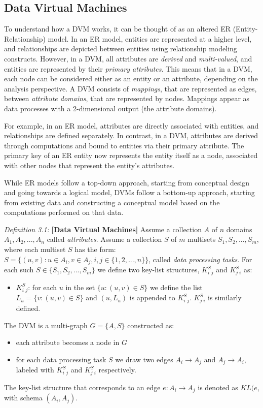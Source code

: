 \subsection{Data Virtual Machines}

To understand how a DVM works, it can be thought of as an altered ER (Entity-Relationship) model. In an ER model, entities are represented at a higher level, and relationships are depicted between entities using relationship modeling constructs. However, in a DVM, all attributes are \textit{derived} and \textit{multi-valued}, and entities are represented by their \textit{primary attributes}. This means that in a DVM, each node can be considered either as an entity or an attribute, depending on the analysis perspective. A DVM consists of \textit{mappings}, that are represented as edges, between \textit{attribute domains}, that are represented by nodes. Mappings appear as data processes with a 2-dimensional output (the attribute domains)\cite{chatziantoniou}.

For example, in an ER model, attributes are directly associated with entities, and relationships are defined separately. In contrast, in a DVM, attributes are derived through computations and bound to entities via their primary attribute. The primary key of an ER entity now represents the entity itself as a node, associated with other nodes that represent the entity's attributes.

While ER models follow a top-down approach, starting from conceptual design and going towards a logical model, DVMs follow a bottom-up approach, starting from existing data and constructing a conceptual model based on the computations performed on that data\cite{chatziantoniou}.

\textit{Definition 3.1:} \textbf{[Data Virtual Machines]} Assume a collection \(A\) of \(n\) domains \(A_1, A_2, ..., A_n\) called \textit{attributes}. Assume a collection \(S\) of \(m\) multisets \(S_1, S_2, ..., S_m\), where each multiset \(S\) has the form: \(S = \{(u, v): u \in A_i, v \in A_j, i, j \in \{1, 2, ..., n\}\}\), called \textit{data processing tasks}. For each such \(S \in \{S_1, S_2, ..., S_m\}\) we define two key-list structures, \(K^S_i_j\) and \(K^S_j_i\) as:
\begin{itemize}
    \item[] \(K^S_i_j\): for each \(u\) in the set \(\{u: (u, v) \in S\}\) we define the list \(L_u = \{v: (u, v) \in S\}\) and \((u, L_u)\) is appended to \(K^S_i_j\). \(K^S_j_i\) is similarly defined.
\end{itemize}
The DVM is a multi-graph \(G = \{A, S\}\) constructed as:
\begin{itemize}
    \item each attribute becomes a node in \(G\)
    \item for each data processing task \(S\) we draw two edges \(A_i \to A_j\) and \(A_j \to A_i\), labeled with \(K^S_i_j\) and \(K^S_j_i\) respectively.
\end{itemize}
The key-list structure that corresponds to an edge \(e: A_i \to A_j\) is denoted as \(KL(e\), with schema \((A_i, A_j)\)\cite{chatziantoniou}.

